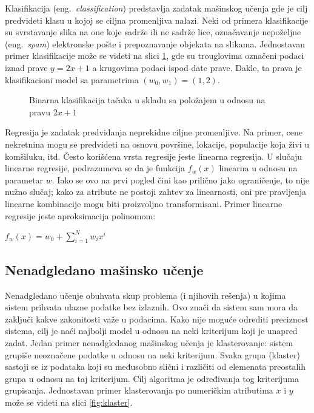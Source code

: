 Klasifikacija (eng.~{\em classification}) predstavlja zadatak mašinskog učenja gde je cilj predvideti klasu u kojoj se ciljna promenljiva nalazi. Neki od primera klasifikacije su svrstavanje slika na one koje sadrže ili ne sadrže lice, označavanje nepoželjne (eng.~{\em spam}) elektronske pošte i prepoznavanje objekata na slikama. 
Jednostavan primer klasifikacije može se videti na slici \ref{fig:bin_klas}, gde su trouglovima označeni podaci iznad prave $y=2x+1$ a krugovima podaci ispod date prave. Dakle, ta prava je klasifikacioni model sa parametrima $(w_0, w_1) = (1, 2)$.

\begin{figure}
	\centering
	\resizebox{.8\linewidth}{!}{}
	\caption{Binarna klasifikacija tačaka u skladu sa položajem u odnosu na pravu $2x+1$}
	\label{fig:bin_klas}
\end{figure}

\par
Regresija je zadatak predviđanja neprekidne ciljne promenljive. Na primer, cene nekretnina mogu se predvideti na osnovu površine, lokacije, populacije koja živi u komšiluku, itd. Često korišćena vrsta regresije jeste linearna regresija. U slučaju linearne regresije, podrazumeva se da je funkcija $f_w(x)$ linearna u odnosu na parametar $w$. Iako se ovo na prvi pogled čini kao prilično jako ograničenje, to nije nužno slučaj; kako za atribute ne postoji zahtev za linearnosti, oni pre pravljenja linearne kombinacije mogu biti proizvoljno transformisani. Primer linearne regresije jeste aproksimacija polinomom:
\begin{center}
	$f_w(x) = w_0 + \sum_{i=1}^{N}w_ix^i$
\end{center}

\subsection{Nenadgledano mašinsko učenje}

Nenadgledano učenje obuhvata skup problema (i njihovih rešenja) u kojima sistem prihvata ulazne podatke bez izlaznih. Ovo znači da sistem sam mora da zaključi kakve zakonitosti važe u podacima.  Kako nije moguće odrediti preciznost sistema, cilj je naći najbolji model u odnosu na neki kriterijum koji je unapred zadat.
Jedan primer nenadgledanog mašinskog učenja je klasterovanje: sistem grupiše neoznačene podatke u odnosu na  neki kriterijum. Svaka grupa (klaster) sastoji se iz podataka koji su međusobno slični i različiti od elemenata preostalih grupa u odnosu na taj kriterijum. Cilj algoritma je određivanja tog kriterijuma grupisanja. Jednostavan primer klasterovanja po numeričkim atributima $x$ i $y$ može se videti na slici \ref{fig:klaster}.
	
